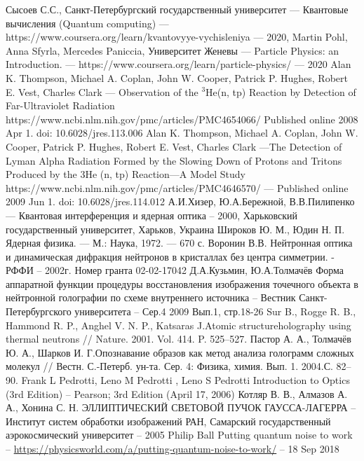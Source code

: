 \documentclass[11pt]{report}
\begin{document}
\begin{thebibliography}{3}
Сысоев С.С., Санкт-Петербургский государственный университет ---  Квантовые вычисления (Quantum computing) --- https://www.coursera.org/learn/kvantovyye-vychisleniya --- 2020, 
Martin Pohl, Anna Sfyrla, Mercedes Paniccia, Университет Женевы --- Particle Physics: an Introduction. --- https://www.coursera.org/learn/particle-physics/ --- 2020
Alan K. Thompson, Michael A. Coplan, John W. Cooper, Patrick P. Hughes, Robert E. Vest, Charles Clark  --- Observation of the $^3 $He(n, tp) Reaction by Detection of Far-Ultraviolet Radiation https://www.ncbi.nlm.nih.gov/pmc/articles/PMC4654066/ Published online 2008 Apr 1. doi: 10.6028/jres.113.006
Alan K. Thompson, Michael A. Coplan, John W. Cooper, Patrick P. Hughes, Robert E. Vest, Charles Clark   ---The Detection of Lyman Alpha Radiation Formed by the Slowing Down of Protons and Tritons Produced by the 3He (n, tp) Reaction—A Model Study https://www.ncbi.nlm.nih.gov/pmc/articles/PMC4646570/ --- Published online 2009 Jun 1. doi: 10.6028/jres.114.012
А.И.Хизер, Ю.А.Бережной, В.В.Пилипенко --- Квантовая интерференция и ядерная оптика -- 2000, Харьковский государственный университет, Харьков, Украина
Широков Ю. М., Юдин Н. П. Ядерная физика. --- М.: Наука, 1972. --- 670 с.
Воронин В.В. Нейтронная оптика и динамическая дифракция нейтронов в кристаллах без центра симметрии. - РФФИ -- 2002г. Номер гранта 02-02-17042 
Д.А.Кузьмин, Ю.А.Толмачёв Форма аппаратной функции процедуры восстановления изображения точечного объекта в нейтронной голографии по схеме внутреннего источника -- Вестник Санкт-Петербургского университета -- Сер.4 2009 Вып.1, стр.18-26 
Sur B., Rogge R. B., Hammond R. P., Anghel V. N. P., Katsaras J.Atomic structureholography using thermal neutrons // Nature. 2001. Vol. 414. P. 525–527.
Пастор А. А., Толмачёв Ю. А., Шарков И. Г.Опознавание образов как метод анализа голограмм сложных молекул // Вестн. С.-Петерб. ун-та. Сер. 4: Физика, химия. Вып. 1. 2004.С. 82–90.
Frank L Pedrotti, Leno M Pedrotti , Leno S Pedrotti Introduction to Optics (3rd Edition) -- Pearson; 3rd Edition (April 17, 2006)
Котляр В. В., Алмазов А. А., Хонина С. Н. ﻿ЭЛЛИПТИЧЕСКИЙ СВЕТОВОЙ ПУЧОК ГАУССА-ЛАГЕРРА --  Институт систем обработки изображений РАН, Самарский государственный аэрокосмический университет -- 2005
Philip Ball Putting quantum noise to work -- \url{https://physicsworld.com/a/putting-quantum-noise-to-work/} -- 18 Sep 2018

\end{thebibliography}
\end{document}
